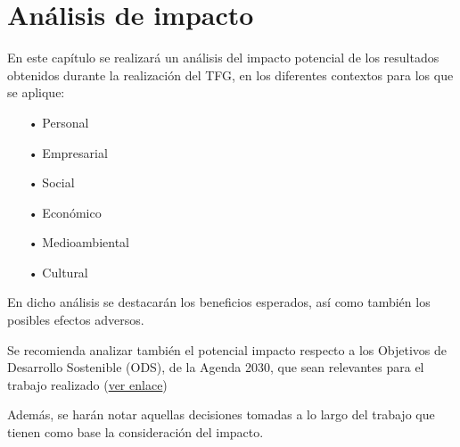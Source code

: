 \chapter{Análisis de impacto}


En este capítulo se realizará un análisis del impacto potencial de los resultados obtenidos durante la realización del TFG, en los diferentes contextos para los que se aplique:

\begin{enumerate}
\item[•] Personal
\item[•] Empresarial
\item[•] Social
\item[•] Económico
\item[•] Medioambiental
\item[•] Cultural
\end{enumerate}

En dicho análisis se destacarán los beneficios esperados, así como también los posibles efectos adversos.

Se recomienda analizar también el potencial impacto respecto a los Objetivos de Desarrollo Sostenible (ODS), de la Agenda 2030, que sean relevantes para el trabajo realizado (\href{https://www.un.org/sustainabledevelopment/es/objetivos-de-desarrollo-sostenible/}{ver enlace})

Además, se harán notar aquellas decisiones tomadas a lo largo del trabajo que tienen como base la consideración del impacto.
